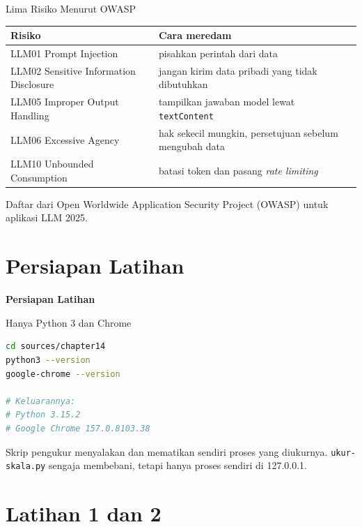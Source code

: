 \documentclass[aspectratio=169, table, 12pt]{beamer}
\begin{document}
\begin{frame}{{\Large Lima Risiko Menurut OWASP}}
  \vspace{4pt}
  \centering
  {\footnotesize
  \begin{tabularx}{\textwidth}{lY}
    \hline
    \textbf{Risiko} & \textbf{Cara meredam} \\
    \hline
    LLM01 Prompt Injection & pisahkan perintah dari data \\
    \hline
    LLM02 Sensitive Information Disclosure & jangan kirim data pribadi yang tidak dibutuhkan \\
    \hline
    LLM05 Improper Output Handling & tampilkan jawaban model lewat \texttt{textContent} \\
    \hline
    LLM06 Excessive Agency & hak sekecil mungkin, persetujuan sebelum mengubah data \\
    \hline
    LLM10 Unbounded Consumption & batasi token dan pasang \textit{rate limiting} \\
    \hline
  \end{tabularx}}

  \vspace{4pt}
  {\small Daftar dari Open Worldwide Application Security Project (OWASP)
  untuk aplikasi LLM 2025.}
\end{frame}

\section{Persiapan Latihan}

\begin{frame}{\hfill}
  \centering
  \Huge{\textbf{Persiapan Latihan}}
\end{frame}

\begin{frame}[fragile]{{\Large Hanya Python 3 dan Chrome}}
  \vspace{2pt}
\begin{lstlisting}[language=bash]
cd sources/chapter14
python3 --version
google-chrome --version

# Keluarannya:
# Python 3.15.2
# Google Chrome 157.0.8103.38
\end{lstlisting}
  \vspace{2pt}
  {\small Skrip pengukur menyalakan dan mematikan sendiri proses yang
  diukurnya. \texttt{ukur-skala.py} sengaja membebani, tetapi hanya proses
  sendiri di 127.0.0.1.}
\end{frame}

\section{Latihan 1 dan 2}
\end{document}
